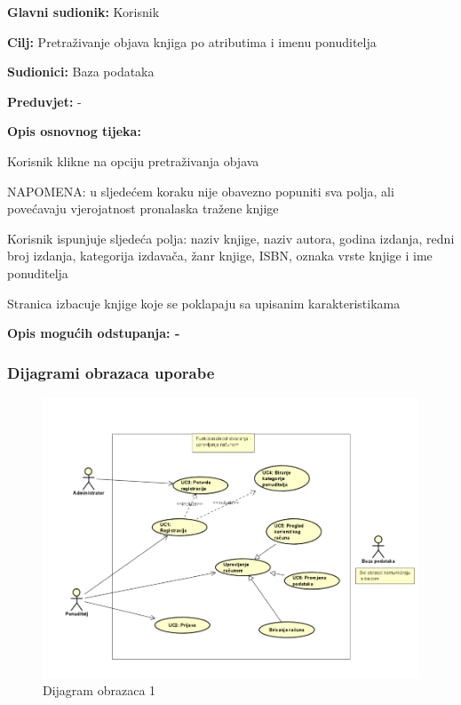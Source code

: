                     \noindent {}
					\begin{packed_item}
	
						\item \textbf{Glavni sudionik: } Korisnik
						\item  \textbf{Cilj:} Pretraživanje objava knjiga po atributima i imenu ponuditelja
						\item  \textbf{Sudionici:} Baza podataka
						\item  \textbf{Preduvjet:} - 
						\item  \textbf{Opis osnovnog tijeka:}
						
						\item[] \begin{packed_enum}
	
							\item Korisnik klikne na opciju pretraživanja objava
                            \item NAPOMENA: u sljedećem koraku nije obavezno popuniti sva polja, ali povećavaju vjerojatnost pronalaska tražene knjige
							\item Korisnik ispunjuje sljedeća polja: naziv knjige, naziv autora, godina izdanja, redni broj izdanja, kategorija izdavača, žanr knjige, ISBN, oznaka vrste knjige i ime ponuditelja
                            \item Stranica izbacuje knjige koje se poklapaju sa upisanim karakteristikama
						\end{packed_enum}
						
						\item  \textbf{Opis mogućih odstupanja: -}
					\end{packed_item}

				\eject	
				
				\subsubsection{Dijagrami obrazaca uporabe}
					
				\begin{figure}
    					\centering
    					\includegraphics[width = \textwidth]{slike/DO1}
    					\caption{Dijagram obrazaca 1}
    					\label{fig:Dijagram obrazaca 1}
				\end{figure}

